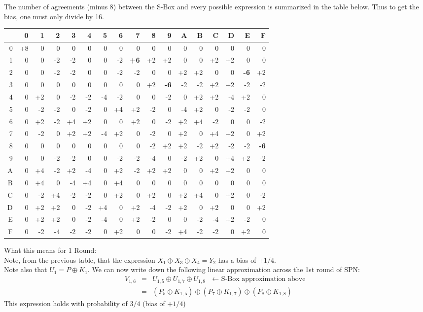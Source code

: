 \documentclass[9pt]{beamer}
\begin{document}
\begin{frame}
The number of agreements (minus 8) between the S-Box and every possible expression is summarized in the table below. Thus to get the bias, one must only divide by 16.\\
\vspace{5mm}
\tiny
\begin{tabular}{|r|r|r|r|r|r|r|r|r|r|r|r|r|r|r|r|r|}
\hline
 &0&1&2&3&4&5&6&7&8&9&A&B&C&D&E&F\\
\hline
0&+8&0&0&0&0&0&0&0&0&0&0&0&0&0&0&0 \\
\hline
1&0&0&-2&-2&0&0&-2&\textbf{+6}&+2&+2&0&0&+2&+2&0&0 \\
\hline
2&0&0&-2&-2&0&0&-2&-2&0&0&+2&+2&0&0&\textbf{-6}&+2 \\
\hline
3&0&0&0&0&0&0&0&0&+2&\textbf{-6}&-2&-2&+2&+2&-2&-2 \\
\hline
4&0&+2&0&-2&-2&-4&-2&0&0&-2&0&+2&+2&-4&+2&0 \\
\hline
5&0&-2&-2&0&-2&0&+4&+2&-2&0&-4&+2&0&-2&-2&0  \\
\hline
6&0&+2&-2&+4&+2&0&0&+2&0&-2&+2&+4&-2&0&0&-2 \\
\hline
7&0&-2&0&+2&+2&-4&+2&0&-2&0&+2&0&+4&+2&0&+2  \\
\hline
8&0&0&0&0&0&0&0&0&-2&+2&+2&-2&+2&-2&-2&\textbf{-6} \\
\hline
9&0&0&-2&-2&0&0&-2&-2&-4&0&-2&+2&0&+4&+2&-2 \\
\hline
A&0&+4&-2&+2&-4&0&+2&-2&+2&+2&0&0&+2&+2&0&0 \\
\hline
B&0&+4&0&-4&+4&0&+4&0&0&0&0&0&0&0&0&0 \\
\hline
C&0&-2&+4&-2&-2&0&+2&0&+2&0&+2&+4&0&+2&0&-2 \\ 
\hline
D&0&+2&+2&0&-2&+4&0&+2&-4&-2&+2&0&+2&0&0&+2 \\
\hline
E&0&+2&+2&0&-2&-4&0&+2&-2&0&0&-2&-4&+2&-2&0 \\
\hline
F&0&-2&-4&-2&-2&0&+2&0&0&-2&+4&-2&-2&0&+2&0 \\
\hline
\end{tabular}
\small
\end{frame}

\begin{frame}
What this means for 1 Round:\\
\vspace{5mm}
Note, from the previous table, that the expression $X_1 \oplus X_3 \oplus X_4 = Y_2$ has a bias of $+1/4$. \\
\vspace{5mm}
Note also that $U_1 = P \oplus K_1$. 
\vspace{5mm} We can now write down the following linear approximation across the 1st round of SPN:
\begin{eqnarray*}
V_{1,6} & = & U_{1,5} \oplus U_{1,7} \oplus U_{1,8} \mbox{  $\leftarrow$ S-Box approximation above}\\
		  & = & (P_5\oplus K_{1,5}) \oplus (P_7\oplus K_{1,7}) \oplus (P_8\oplus K_{1,8})
\end{eqnarray*}
This expression holds with probability of $3/4$ (bias of $+1/4$)
\end{frame}
\end{document}
